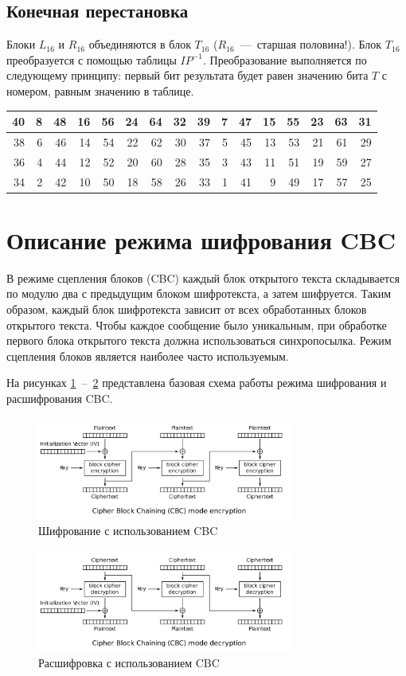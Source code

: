 \subsection{Конечная перестановка}

Блоки $L_{16}$ и $R_{16}$ объединяются в блок $T_{16}$ ($R_{16}$~---~старшая половина!). Блок $T_{16}$ преобразуется с помощью таблицы $IP^{-1}$. Преобразование выполняется по следующему принципу: первый бит результата будет равен значению бита $T$ с номером, равным значению в таблице.

\begin{center}
\begin{tabular}{|r|r|r|r|r|r|r|r|r|r|r|r|r|r|r|r|} 
 \hline
40 & 8 & 48 & 16 & 56 & 24 & 64 & 32 & 39 & 7 & 47 & 15 & 55 & 23 & 63 & 31 \\ \hline
38 & 6 & 46 & 14 & 54 & 22 & 62 & 30 & 37 & 5 & 45 & 13 & 53 & 21 & 61 & 29 \\ \hline
36 & 4 & 44 & 12 & 52 & 20 & 60 & 28 & 35 & 3 & 43 & 11 & 51 & 19 & 59 & 27 \\ \hline
34 & 2 & 42 & 10 & 50 & 18 & 58 & 26 & 33 & 1 & 41 & 9 & 49 & 17 & 57 & 25 \\ \hline
\end{tabular}
\end{center}

\section{Описание режима шифрования CBC}

В режиме сцепления блоков (CBC) каждый блок открытого текста складывается по модулю два с предыдущим блоком шифротекста, а затем шифруется. Таким образом, каждый блок шифротекста зависит от всех обработанных блоков открытого текста. Чтобы каждое сообщение было уникальным, при обработке первого блока открытого текста должна использоваться синхропосылка. Режим сцепления блоков является наиболее часто используемым.

На рисунках \ref{fig:cbc_encryption}~--~\ref{fig:cbc_decryption} представлена базовая схема работы режима шифрования и расшифрования CBC.

\begin{figure}[h!]
\centering
\includegraphics[width=0.75\textwidth]{assets/cbc_encryption.png}
\caption{Шифрование с использованием CBC}
\label{fig:cbc_encryption}
\end{figure}

\begin{figure}[h!]
\centering
\includegraphics[width=0.75\textwidth]{assets/cbc_decryption.png}
\caption{Расшифровка с использованием CBC}
\label{fig:cbc_decryption}
\end{figure}
